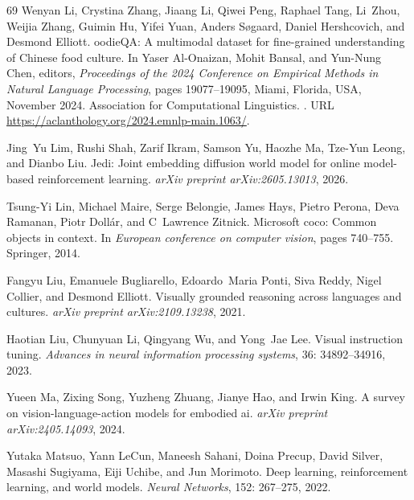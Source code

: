 \begin{thebibliography}{69}
Wenyan Li, Crystina Zhang, Jiaang Li, Qiwei Peng, Raphael Tang, Li~Zhou, Weijia Zhang, Guimin Hu, Yifei Yuan, Anders S{\o}gaard, Daniel Hershcovich, and Desmond Elliott.
oodie{QA}: A multimodal dataset for fine-grained understanding of {C}hinese food culture.
\newblock In Yaser Al-Onaizan, Mohit Bansal, and Yun-Nung Chen, editors, \emph{Proceedings of the 2024 Conference on Empirical Methods in Natural Language Processing}, pages 19077--19095, Miami, Florida, USA, November 2024. Association for Computational Linguistics.
\newblock {}.
\newblock URL \url{https://aclanthology.org/2024.emnlp-main.1063/}.

Jing~Yu Lim, Rushi Shah, Zarif Ikram, Samson Yu, Haozhe Ma, Tze-Yun Leong, and Dianbo Liu.
\newblock Jedi: Joint embedding diffusion world model for online model-based reinforcement learning.
\newblock \emph{arXiv preprint arXiv:2605.13013}, 2026.

Tsung-Yi Lin, Michael Maire, Serge Belongie, James Hays, Pietro Perona, Deva Ramanan, Piotr Doll{\'a}r, and C~Lawrence Zitnick.
\newblock Microsoft coco: Common objects in context.
\newblock In \emph{European conference on computer vision}, pages 740--755. Springer, 2014.

Fangyu Liu, Emanuele Bugliarello, Edoardo~Maria Ponti, Siva Reddy, Nigel Collier, and Desmond Elliott.
\newblock Visually grounded reasoning across languages and cultures.
\newblock \emph{arXiv preprint arXiv:2109.13238}, 2021.

Haotian Liu, Chunyuan Li, Qingyang Wu, and Yong~Jae Lee.
\newblock Visual instruction tuning.
\newblock \emph{Advances in neural information processing systems}, 36: 34892--34916, 2023.

Yueen Ma, Zixing Song, Yuzheng Zhuang, Jianye Hao, and Irwin King.
\newblock A survey on vision-language-action models for embodied ai.
\newblock \emph{arXiv preprint arXiv:2405.14093}, 2024.

Yutaka Matsuo, Yann LeCun, Maneesh Sahani, Doina Precup, David Silver, Masashi Sugiyama, Eiji Uchibe, and Jun Morimoto.
\newblock Deep learning, reinforcement learning, and world models.
\newblock \emph{Neural Networks}, 152: 267--275, 2022.


\end{thebibliography}
